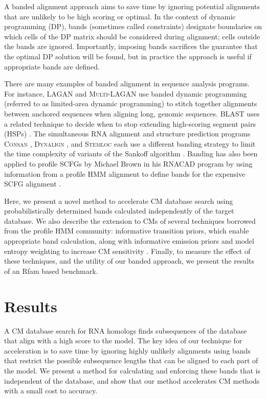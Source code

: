 \documentclass[11pt]{article}
\begin{document}
A banded alignment approach aims to save time by ignoring 
potential alignments that are unlikely to be high scoring or
optimal. 
In the context of dynamic programming (DP), bands (sometimes
called constraints) designate boundaries on which
cells of the DP matrix should be considered during alignment;
cells outside the bands are ignored. Importantly, imposing bands
sacrifices the guarantee that the optimal DP solution will be found,
but in practice the approach is useful if appropriate bands are
defined. 

There are many examples of banded alignment in sequence
analysis programs. For instance, \textsc{LAGAN} and
\textsc{Multi-LAGAN} use banded dynamic programming (referred to as
limited-area dynamic programming) to stitch together alignments
between anchored sequences when aligning long, genomic sequences.
\textsc{BLAST} uses a related technique
to decide when to stop extending high-scoring segment pairs (HSPs)
\cite{Altschul90}. 
The simultaneous RNA alignment and structure prediction programs
\textsc{Consan} \cite{Dowell06}, \textsc{Dynalign} \cite{Mathews05},
and \textsc{Stemloc} \cite{Holmes05} each use a different banding strategy
to limit the time complexity of variants of the Sankoff algorithm
\cite{Sankoff85}. Banding has also been applied to profile SCFGs by
Michael Brown in his \textsc{RNACAD} program by using information from
a profile HMM alignment to define bands for the expensive SCFG
alignment \cite{Brown00}. 

Here, we present a novel method to accelerate CM 
database search using probabilistically determined bands calculated
independently of the target database. 
We also describe the extension to CMs of
several techniques borrowed from the profile HMM community:
informative transition priors, which enable
appropriate band calculation, along with informative emission priors
and model entropy weighting to increase CM sensitivity . Finally, to
measure the effect of these techniques, and the utility of our
banded approach, we present the results of an Rfam based benchmark.

\section{Results}

A CM database search for RNA homologs finds subsequences 
of the database that align with a high score to the model. 
The key idea of our technique for acceleration is to save time by
ignoring highly unlikely alignments using bands that restrict the
possible subsequence lengths that can be aligned to each part of the model.
We present a method for calculating and enforcing these bands that is
independent of the database, and show that our method accelerates CM
methods with a small cost to accuracy.
\end{document}
